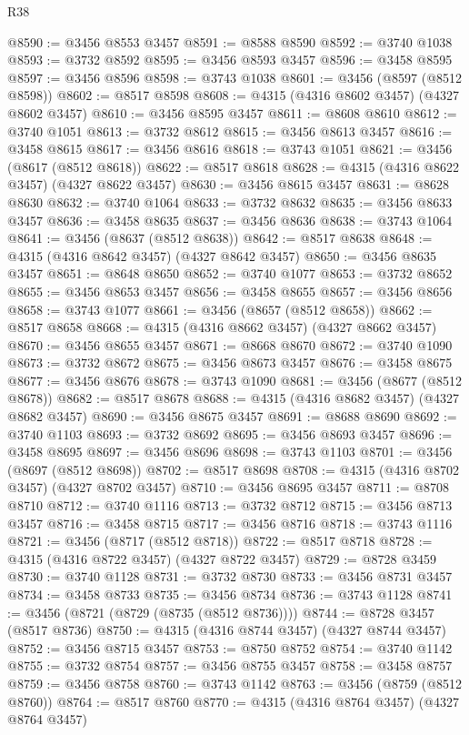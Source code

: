 \begin{lexlean}{R38}
\begin{coremodule}
@8590 := @3456 @8553 @3457
@8591 := @8588 @8590
@8592 := @3740 @1038
@8593 := @3732 @8592
@8595 := @3456 @8593 @3457
@8596 := @3458 @8595
@8597 := @3456 @8596
@8598 := @3743 @1038
@8601 := @3456 (@8597 (@8512 @8598))
@8602 := @8517 @8598
@8608 := @4315 (@4316 @8602 @3457) (@4327 @8602 @3457)
@8610 := @3456 @8595 @3457
@8611 := @8608 @8610
@8612 := @3740 @1051
@8613 := @3732 @8612
@8615 := @3456 @8613 @3457
@8616 := @3458 @8615
@8617 := @3456 @8616
@8618 := @3743 @1051
@8621 := @3456 (@8617 (@8512 @8618))
@8622 := @8517 @8618
@8628 := @4315 (@4316 @8622 @3457) (@4327 @8622 @3457)
@8630 := @3456 @8615 @3457
@8631 := @8628 @8630
@8632 := @3740 @1064
@8633 := @3732 @8632
@8635 := @3456 @8633 @3457
@8636 := @3458 @8635
@8637 := @3456 @8636
@8638 := @3743 @1064
@8641 := @3456 (@8637 (@8512 @8638))
@8642 := @8517 @8638
@8648 := @4315 (@4316 @8642 @3457) (@4327 @8642 @3457)
@8650 := @3456 @8635 @3457
@8651 := @8648 @8650
@8652 := @3740 @1077
@8653 := @3732 @8652
@8655 := @3456 @8653 @3457
@8656 := @3458 @8655
@8657 := @3456 @8656
@8658 := @3743 @1077
@8661 := @3456 (@8657 (@8512 @8658))
@8662 := @8517 @8658
@8668 := @4315 (@4316 @8662 @3457) (@4327 @8662 @3457)
@8670 := @3456 @8655 @3457
@8671 := @8668 @8670
@8672 := @3740 @1090
@8673 := @3732 @8672
@8675 := @3456 @8673 @3457
@8676 := @3458 @8675
@8677 := @3456 @8676
@8678 := @3743 @1090
@8681 := @3456 (@8677 (@8512 @8678))
@8682 := @8517 @8678
@8688 := @4315 (@4316 @8682 @3457) (@4327 @8682 @3457)
@8690 := @3456 @8675 @3457
@8691 := @8688 @8690
@8692 := @3740 @1103
@8693 := @3732 @8692
@8695 := @3456 @8693 @3457
@8696 := @3458 @8695
@8697 := @3456 @8696
@8698 := @3743 @1103
@8701 := @3456 (@8697 (@8512 @8698))
@8702 := @8517 @8698
@8708 := @4315 (@4316 @8702 @3457) (@4327 @8702 @3457)
@8710 := @3456 @8695 @3457
@8711 := @8708 @8710
@8712 := @3740 @1116
@8713 := @3732 @8712
@8715 := @3456 @8713 @3457
@8716 := @3458 @8715
@8717 := @3456 @8716
@8718 := @3743 @1116
@8721 := @3456 (@8717 (@8512 @8718))
@8722 := @8517 @8718
@8728 := @4315 (@4316 @8722 @3457) (@4327 @8722 @3457)
@8729 := @8728 @3459
@8730 := @3740 @1128
@8731 := @3732 @8730
@8733 := @3456 @8731 @3457
@8734 := @3458 @8733
@8735 := @3456 @8734
@8736 := @3743 @1128
@8741 := @3456 (@8721 (@8729 (@8735 (@8512 @8736))))
@8744 := @8728 @3457 (@8517 @8736)
@8750 := @4315 (@4316 @8744 @3457) (@4327 @8744 @3457)
@8752 := @3456 @8715 @3457
@8753 := @8750 @8752
@8754 := @3740 @1142
@8755 := @3732 @8754
@8757 := @3456 @8755 @3457
@8758 := @3458 @8757
@8759 := @3456 @8758
@8760 := @3743 @1142
@8763 := @3456 (@8759 (@8512 @8760))
@8764 := @8517 @8760
@8770 := @4315 (@4316 @8764 @3457) (@4327 @8764 @3457)

\end{coremodule}
\end{lexlean}
